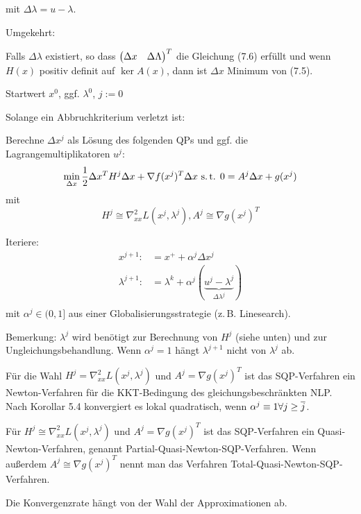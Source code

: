 mit $\Delta \lambda = u-\lambda$.

Umgekehrt:


Falls $\Delta \lambda$ existiert, so dass $\begin{pmatrix} \Delta x & \Delta \Lambda \end{pmatrix}^T$ die Gleichung (7.6) erfüllt und wenn $H(x)$ positiv definit auf $\ker A(x)$, dann ist $\Delta x$ Minimum von (7.5).


\bitm
\item Startwert $x^0$, ggf. $\lambda^0$, $j:=0$
\item Solange ein Abbruchkriterium verletzt ist:
\bitm
\item Berechne $\Delta x^j$ als Lösung des folgenden QPs und ggf. die Lagrangemultiplikatoren $u^j$:
\[ \min_{\Delta x} \frac 12 \Delta x^T H^j \Delta x + \nabla f(x^j)^T \Delta x \text{ s.\,t. }0 = A^j \Delta x + g(x^j) \]
mit
\[H^j \cong \nabla_{xx}^2 L(x^j, \lambda^j), A^j \cong \nabla g(x^j)^T \]
\item Iteriere:
\begin{align*}
x^{j+1} :&= x^+ + \alpha^j \Delta x^j \\
\lambda^{j+1} :&= \lambda^k + \alpha^j (\underbrace{u^j-\lambda^j}_{\Delta \lambda^j}) \\
\end{align*}
mit $\alpha^j \in (0,1]$ aus einer Globalisierungsstrategie (z.\,B. Linesearch).
\eitm
\eitm

Bemerkung: $\lambda^j$ wird benötigt zur Berechnung von $H^j$ (siehe unten) und zur Ungleichungsbehandlung. Wenn $\alpha^j=1$ hängt $\lambda^{j+1}$ nicht von $\lambda^j$ ab.


Für die Wahl $H^j = \nabla_{xx}^2 L(x^j, \lambda^j)$ und $A^j = \nabla g(x^j)^T$ ist das SQP-Verfahren ein Newton-Verfahren für die KKT-Bedingung des gleichungsbeschränkten NLP. Nach Korollar 5.4 konvergiert es lokal quadratisch, wenn $\alpha^j \equiv 1 \forall j \geq \overline j$.


Für $H^j \cong \nabla_{xx}^2 L(x^j, \lambda^j)$ und $A^j = \nabla g(x^j)^T$ ist das SQP-Verfahren ein Quasi-Newton-Verfahren, genannt Partial-Quasi-Newton-SQP-Verfahren. Wenn außerdem $A^j \cong \nabla g(x^j)^T$ nennt man das Verfahren Total-Quasi-Newton-SQP-Verfahren.

Die Konvergenzrate hängt von der Wahl der Approximationen ab.

